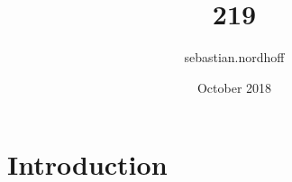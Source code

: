 \documentclass{article}
\title{219}
\author{sebastian.nordhoff }
\date{October 2018}
\begin{document}
\maketitle

\section{Introduction}
\end{document}
